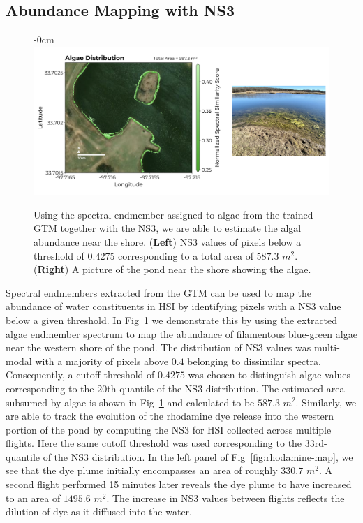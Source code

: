 \documentclass[remotesensing,article,submit,pdftex,moreauthors]{Definitions/mdpi}
\begin{document}
\subsection{Abundance Mapping with NS3}

\begin{figure}[t]
\begin{adjustwidth}{-\extralength}{0cm}
\centering
\includegraphics[width=17.0cm]{paper/figures/results/algae.png}
\end{adjustwidth}
\caption{Using the spectral endmember assigned to algae from the trained GTM together with the NS3, we are able to estimate the algal abundance near the shore. (\textbf{Left}) NS3 values of pixels below a threshold of 0.4275 corresponding to a total area of $587.3$ $m^2$. (\textbf{Right}) A picture of the pond near the shore showing the algae.\label{fig:algae-map}}
\end{figure}  

Spectral endmembers extracted from the GTM can be used to map the abundance of water constituents in HSI by identifying pixels with a NS3 value below a given threshold. In Fig~\ref{fig:algae-map} we demonstrate this by using the extracted algae endmember spectrum to map the abundance of filamentous blue-green algae near the western shore of the pond. The distribution of NS3 values was multi-modal with a majority of pixels above $0.4$ belonging to dissimilar spectra. Consequently, a cutoff threshold of $0.4275$ was chosen to distinguish algae values corresponding to the $20$th-quantile of the NS3 distribution. The estimated area subsumed by algae is shown in Fig~\ref{fig:algae-map} and calculated to be $587.3$ $m^2$. Similarly, we are able to track the evolution of the rhodamine dye release into the western portion of the pond by computing the NS3 for HSI collected across multiple flights. Here the same cutoff threshold was used corresponding to the $33$rd-quantile of the NS3 distribution. In the left panel of Fig~\ref{fig:rhodamine-map}, we see that the dye plume initially encompasses an area of roughly $330.7$ $m^2$. A second flight performed 15 minutes later reveals the dye plume to have increased to an area of $1495.6$ $m^2$. The increase in NS3 values between flights reflects the dilution of dye as it diffused into the water.
\end{document}
